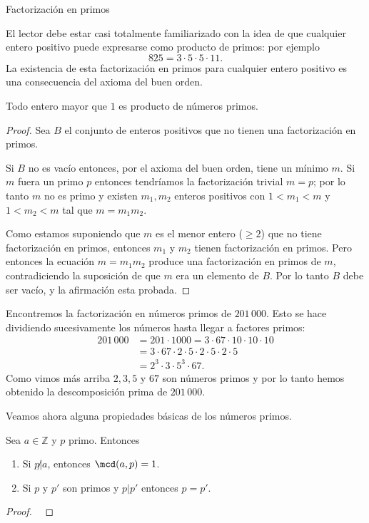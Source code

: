 \begin{section}{Factorización en primos}
\begin{observacion*}
\end{observacion*} 


El lector debe estar casi totalmente familiarizado con la idea de que cualquier entero positivo puede
expresarse como producto de primos: por ejemplo
$$
825=3\cdot 5\cdot 5\cdot 11.
$$
La existencia de esta factorización en primos para cualquier entero positivo es una consecuencia del axioma del buen orden.

\begin{teorema}
Todo  entero  mayor que $1$ es producto de números primos. 
\end{teorema}                                                
\begin{proof} Sea $B$ el conjunto de enteros positivos que no tienen una factorización en primos.

Si $B$ no es vacío entonces, por el axioma del buen orden, tiene un mínimo $m$. Si $m$ fuera un primo $p$ entonces tendríamos la factorización trivial $m=p$; por lo tanto $m$ no es primo y existen $m_1,m_2$ enteros positivos con  $1<m_1<m$ y $1<m_2< m$ tal que $m=m_1m_2$.

Como estamos suponiendo que $m$ es el menor entero ($\ge 2$) que no tiene factorización en primos, entonces $m_1$ y $m_2$ tienen factorización en primos. Pero entonces la ecuación $m=m_1m_2$ produce una factorización en primos de $m$, contradiciendo la suposición de que $m$ era un elemento de $B$. Por lo tanto $B$ debe ser vacío, y la afirmación esta probada.
\end{proof}

\begin{ejemplo*} 
Encontremos la factorización en números primos de $201\,000$. Esto se hace di\-vi\-dien\-do  sucesivamente los números hasta llegar a factores primos:
\begin{align*}
201\,000 &= 201\cdot 1000 = 3\cdot 67\cdot 10\cdot 10\cdot 10\\ &=  3\cdot 67\cdot 2\cdot 5 \cdot 2\cdot 5 \cdot 2\cdot 5 \\&= 2^3\cdot 3\cdot 5^3\cdot 67.
\end{align*}
Como vimos más arriba $2, 3, 5$ y $67$ son  números primos y por lo tanto hemos obtenido la descomposición prima de $201\,000$.
\end{ejemplo*}


Veamos ahora alguna propiedades básicas de los números primos.

\begin{observacion} \label{pdivpp}
Sea $a \in \mathbb Z$ y $p$ primo. Entonces 
\begin{enumerate}[label=\textit{\alph*)}]
\item\label{it.propmcd_a}  Si $p{\not|}a$, entonces $\mcd(a,p) = 1$.
\item\label{it.propmcd_b}  Si $p$ y $p'$ son primos y $p|p'$ entonces $p=p'$.
\end{enumerate}
\end{observacion}
\begin{proof}
\


\end{proof}
\end{section}
